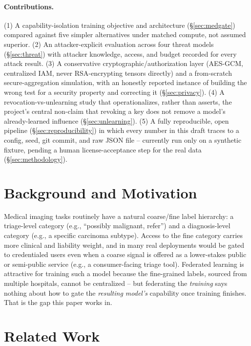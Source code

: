 \documentclass[11pt]{article}
\begin{document}
\paragraph{Contributions.} (1) A capability-isolation training objective and
architecture (\S\ref{sec:medgate}) compared against five simpler alternatives
under matched compute, not assumed superior. (2) An attacker-explicit
evaluation across four threat models (\S\ref{sec:threat}) with attacker
knowledge, access, and budget recorded for every attack result. (3) A
conservative cryptographic/authorization layer (AES-GCM, centralized IAM,
never RSA-encrypting tensors directly) and a from-scratch secure-aggregation
simulation, with an honestly reported instance of building the wrong test for
a security property and correcting it (\S\ref{sec:privacy}). (4) A
revocation-vs-unlearning study that operationalizes, rather than asserts, the
project's central non-claim that revoking a key does not remove a model's
already-learned influence (\S\ref{sec:unlearning}). (5) A fully reproducible,
open pipeline (\S\ref{sec:reproducibility}) in which every number in this
draft traces to a config, seed, git commit, and raw JSON file -- currently
run only on a synthetic fixture, pending a human license-acceptance step for
the real data (\S\ref{sec:methodology}).

\section{Background and Motivation}
\label{sec:background}

Medical imaging tasks routinely have a natural coarse/fine label hierarchy:
a triage-level category (e.g., ``possibly malignant, refer'') and a
diagnosis-level category (e.g., a specific carcinoma subtype). Access to the
fine category carries more clinical and liability weight, and in many
real deployments would be gated to credentialed users even when a coarse
signal is offered as a lower-stakes public or semi-public service (e.g., a
consumer-facing triage tool). Federated learning is attractive for training
such a model because the fine-grained labels, sourced from multiple
hospitals, cannot be centralized -- but federating the \emph{training} says
nothing about how to gate the \emph{resulting model's} capability once
training finishes. That is the gap this paper works in.

\section{Related Work}
\label{sec:related}
\end{document}
